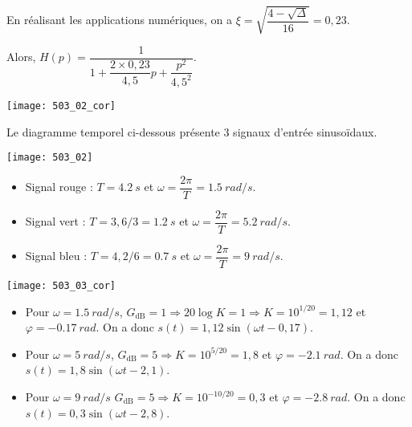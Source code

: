  En réalisant les applications numériques, on a $\xi = \sqrt{\dfrac{4-\sqrt{\Delta}}{16}} = 0,23$.
  
Alors, $H(p)=\dfrac{1}{1+\dfrac{2\times 0,23}{4,5}p+\dfrac{p^2}{4,5^2}}$.
\begin{marginfigure}
\texttt{[image: 503\_02\_cor]}
\end{marginfigure}
\else

Le diagramme temporel ci-dessous présente 3 signaux d'entrée sinusoïdaux.
\begin{marginfigure}
\texttt{[image: 503\_02]}
\end{marginfigure}

\fi

\ifprof
\begin{itemize}
\item Signal rouge : $T=\SI{4,2}{s}$ et $\omega= \dfrac{2\pi}{T} = \SI{1,5}{rad/s}$.
\item Signal vert : $T=3,6/3 = \SI{1,2}{s}$ et $\omega= \dfrac{2\pi}{T} = \SI{5,2}{rad/s}$.
\item Signal bleu : $T=4,2/6 = \SI{0,7}{s}$  et $\omega= \dfrac{2\pi}{T} = \SI{9}{rad/s}$.
\end{itemize}
\else
\fi


\ifprof
\begin{marginfigure}
\texttt{[image: 503\_03\_cor]}
\end{marginfigure}

\begin{itemize}
\item Pour  $\omega = \SI{1,5}{rad/s}$, $G_{\text{dB}}=1 \Rightarrow 20\log K = 1 \Rightarrow  K = 10^{1/20} = 1,12$ et $\varphi =  -\SI{0,17}{rad}$. On a donc $s(t)=1,12\sin\left(\omega t - 0,17\right)$.
\item Pour  $\omega = \SI{5}{rad/s}$, $G_{\text{dB}}=5 \Rightarrow  K = 10^{5/20} = 1,8$ et $\varphi =  -\SI{2,1}{rad}$. On a donc $s(t)=1,8\sin\left(\omega t - 2,1\right)$.
\item Pour  $\omega = \SI{9}{rad/s}$ $G_{\text{dB}}=5 \Rightarrow  K = 10^{-10/20} = 0,3$ et 
$\varphi =  -\SI{2,8}{rad}$. On a donc $s(t)=0,3\sin\left(\omega t - 2,8\right)$.
\end{itemize}
\else
\fi





